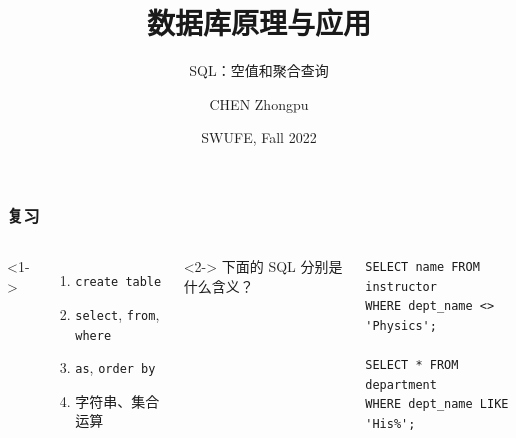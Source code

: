\documentclass[aspectratio=169, 14pt]{beamer}
\title[Database Principles and Applications] %
{数据库原理与应用}
\subtitle{SQL：空值和聚合查询}
\author[CHEN Zhongpu] %
{CHEN Zhongpu}
\institute[] %
{
  School of Computing and Artificial Intelligence \\
  \href{mailto:zpchen@swufe.edu.cn}{zpchen@swufe.edu.cn}
}
\date[] %
{SWUFE, Fall 2022}
\begin{document}
\frame{\titlepage}

\begin{frame}[fragile]
    \frametitle{复习}
    \begin{columns}
        <1->
        \begin{enumerate}
            \item \texttt{create table}
            \item \texttt{select}, \texttt{from}, \texttt{where}
            \item \texttt{as}, \texttt{order by}
            \item 字符串、集合运算        
        \end{enumerate}
        <2->
        下面的 SQL 分别是什么含义？
        \begin{verbatim}
SELECT name FROM instructor 
WHERE dept_name <> 'Physics';

SELECT * FROM department
WHERE dept_name LIKE 'His%';
        \end{verbatim}         
    \end{columns}

\end{frame}
\end{document}
